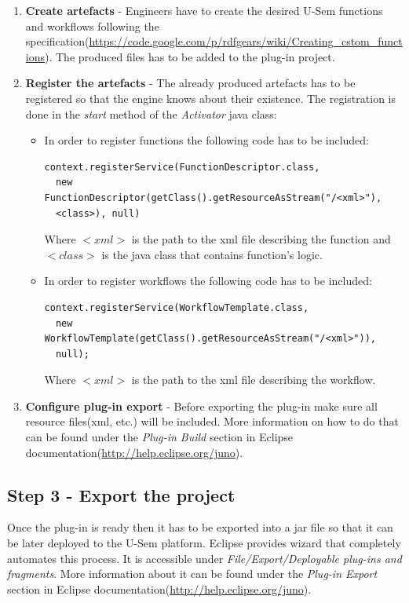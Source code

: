 \documentclass[a4paper, notitlepage]{article}
\begin{document}
\begin{enumerate}
	\item \textbf{Create artefacts} - Engineers have to create the desired U-Sem functions and workflows following the specification(\url{https://code.google.com/p/rdfgears/wiki/Creating_cstom_functions}). The produced files has to be added to the plug-in project.
	\item \textbf{Register the artefacts} - The already produced artefacts has to be registered so that the engine knows about their existence. The registration is done in the \textit{start} method of the \textit{Activator} java class:
	\begin{itemize}
	
		\item In order to register functions the following code has to be included:
		
\begin{lstlisting}
context.registerService(FunctionDescriptor.class, 
  new FunctionDescriptor(getClass().getResourceAsStream("/<xml>"), 
  <class>), null)
\end{lstlisting}

		Where \textit{$<xml>$} is the path to the xml file describing the function and \textit{$<class>$} is the java class that contains function's logic.
		
		\item In order to register workflows the following code has to be included: 
\begin{lstlisting}
context.registerService(WorkflowTemplate.class,
  new WorkflowTemplate(getClass().getResourceAsStream("/<xml>")),
  null);
\end{lstlisting}

		Where \textit{$<xml>$} is the path to the xml file describing the workflow.
		
	\end{itemize}
	\item \textbf{Configure plug-in export} -  Before exporting the plug-in make sure all resource files(xml, etc.) will be included. More information on how to do that can be found under the \textit{Plug-in Build} section in Eclipse documentation(\url{http://help.eclipse.org/juno}).
	
	
\end{enumerate}

\subsection{Step 3 - Export the project}
Once the plug-in is ready then it has to be exported into a jar file so that it can be later deployed to the U-Sem platform. Eclipse provides wizard that completely automates this process. It is accessible under \textit{File/Export/Deployable plug-ins and fragments}. More information about it can be found under the \textit{Plug-in Export} section in Eclipse documentation(\url{http://help.eclipse.org/juno}).
\end{document}
